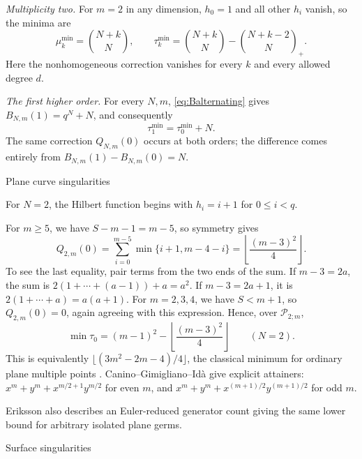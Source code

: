 \documentclass[12pt,reqno]{amsart}
\makeatletter
\renewcommand\subsection{\@startsection{subsection}{2}%
  \z@{.8\linespacing\@plus.3\linespacing}{.35\linespacing}%
  {\normalfont\bfseries}}
\newcommand{\tbin}[2]{\binom{#1}{#2}_{\!+}}
\theoremstyle{definition}
\makeatother
\begin{document}
\emph{Multiplicity two.}
For $m=2$ in any dimension, $h_0=1$ and all other $h_i$
vanish, so the minima are
\[
 \mu_k^{\min}=\binom{N+k}{N},\qquad
 \tau_k^{\min}=\binom{N+k}{N}-\tbin{N+k-2}{N}.
\]
Here the nonhomogeneous correction vanishes for every $k$ and every
allowed degree $d$.

\emph{The first higher order.}
For every $N,m$, \eqref{eq:Balternating} gives
$B_{N,m}(1)=q^N+N$, and consequently
\begin{equation}\label{eq:orderone}
 \tau_1^{\min}=\tau_0^{\min}+N.
\end{equation}
The same correction $Q_{N,m}(0)$ occurs at both orders; the difference comes
entirely from $B_{N,m}(1)-B_{N,m}(0)=N$.

\subsection{Plane curve singularities}

For $N=2$, the Hilbert function begins with $h_i=i+1$ for
$0\leq i<q$.

For $m\geq5$, we have $S-m-1=m-5$, so symmetry gives
\[
 Q_{2,m}(0)=\sum_{i=0}^{m-5}\min\{i+1,m-4-i\}
     =\left\lfloor\frac{(m-3)^2}{4}\right\rfloor.
\]
To see the last equality, pair terms from the two ends of the sum.
If $m-3=2a$, the sum is $2(1+\cdots+(a-1))+a=a^2$.
If $m-3=2a+1$, it is $2(1+\cdots+a)=a(a+1)$.
For $m=2,3,4$, we have $S<m+1$, so $Q_{2,m}(0)=0$,
again agreeing with this expression. Hence, over $\mathcal P_{2;m}$,
\begin{equation}\label{eq:plane}
 \min\tau_0=(m-1)^2-\left\lfloor\frac{(m-3)^2}{4}\right\rfloor
 \qquad(N=2).
\end{equation}
This is equivalently $\lfloor(3m^2-2m-4)/4\rfloor$, the
classical minimum for ordinary plane multiple points
\cite{BGM,CaninoGimiglianoIda}.
Canino--Gimigliano--Id\`a
\cite[Theorem~5.7 of arXiv v2]{CaninoGimiglianoIda} give explicit attainers:
$x^m+y^m+x^{m/2+1}y^{m/2}$ for even $m$, and
$x^m+y^m+x^{(m+1)/2}y^{(m+1)/2}$ for odd $m$.

Eriksson \cite{ErikssonFloors} also describes an Euler-reduced
generator count giving the same lower bound for arbitrary isolated
plane germs.

\subsection{Surface singularities}
 
\end{document}
